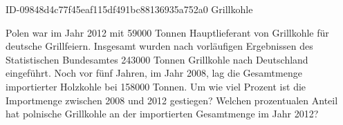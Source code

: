 \begin{exercise}
      {ID-09848d4c77f45eaf115df491bc88136935a752a0}
      {Grillkohle}
  \ifproblem\problem\par
    Polen war im Jahr 2012 mit \num{59000} Tonnen Hauptlieferant von Grillkohle für
    deutsche Grillfeiern. Insgesamt wurden nach vorläufigen Ergebnissen des
    Statistischen Bundesamtes \num{243000} Tonnen Grillkohle nach Deutschland
    eingeführt. Noch vor fünf Jahren, im Jahr 2008, lag die Gesamtmenge
    importierter Holzkohle bei \num{158000} Tonnen.
    Um wie viel Prozent ist die Importmenge zwischen 2008 und 2012 gestiegen?
    Welchen prozentualen Anteil hat polnische Grillkohle an der importierten
    Gesamtmenge im Jahr 2012?
  \fi
\end{exercise}
